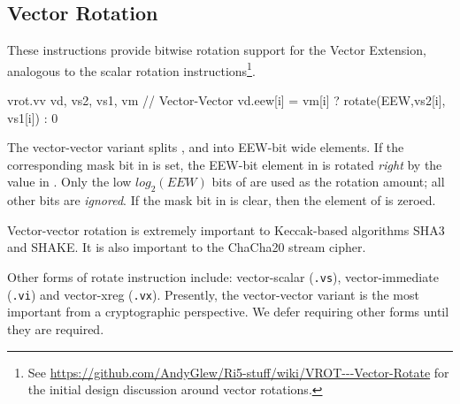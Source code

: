 
\subsection{Vector Rotation}

These instructions provide bitwise rotation support for the
Vector Extension, analogous to the scalar rotation instructions\footnote{
See \url{https://github.com/AndyGlew/Ri5-stuff/wiki/VROT---Vector-Rotate}
for the initial design discussion around vector rotations.
}.

\begin{cryptoisa}
vrot.vv     vd, vs2, vs1, vm        // Vector-Vector
    vd.eew[i] = vm[i] ? rotate(EEW,vs2[i], vs1[i]) : 0
\end{cryptoisa}

The vector-vector variant splits \vrd,  and  into
EEW-bit wide elements.
If the corresponding mask bit in \vm is set,
the EEW-bit element in  is rotated
{\em right} by the value in .
Only the low $log_2(EEW)$ bits of  are used as the rotation
amount; all other bits are {\em ignored}.
If the mask bit in \vm is clear, then the element of \vrd is zeroed.


Vector-vector rotation is extremely important to Keccak-based algorithms 
SHA3 and SHAKE.
It is also important to the ChaCha20 stream cipher.

Other forms of rotate instruction include:
vector-scalar (\texttt{.vs}),
vector-immediate (\texttt{.vi})
and
vector-xreg (\texttt{.vx}).
Presently, the vector-vector variant is the most important from a
cryptographic perspective.
We defer requiring other forms until they are required.
